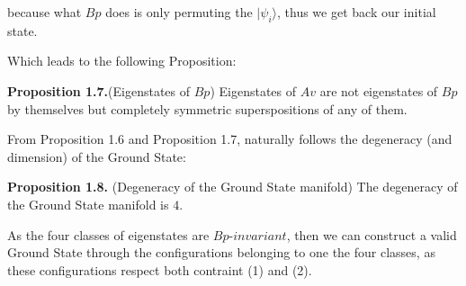 \documentclass[12pt]{report}
\begin{document}
\begin{minipage}{1 \textwidth}
	because what $Bp$ does is only permuting the $|\psi_i\rangle$, thus we get back our initial state. \newline
	
	Which leads to the following Proposition:\newline
	
	\textbf{Proposition 1.7.}(Eigenstates of $Bp$) Eigenstates of $Av$ are not eigenstates of $Bp$ by themselves but completely symmetric superspositions of any of them.\newline
	
	From Proposition 1.6 and Proposition 1.7, naturally follows the degeneracy (and dimension) of the Ground State:\newline
	
	\textbf{Proposition 1.8.} (Degeneracy of the Ground State manifold) The degeneracy of the Ground State manifold is $4$. \newline
	
	As the four classes of eigenstates are $Bp$-$invariant$, then we can construct a valid Ground State through the configurations belonging to one the four classes, as these configurations respect both contraint (1) and (2).\newline
	
\end{minipage}
\end{document}
